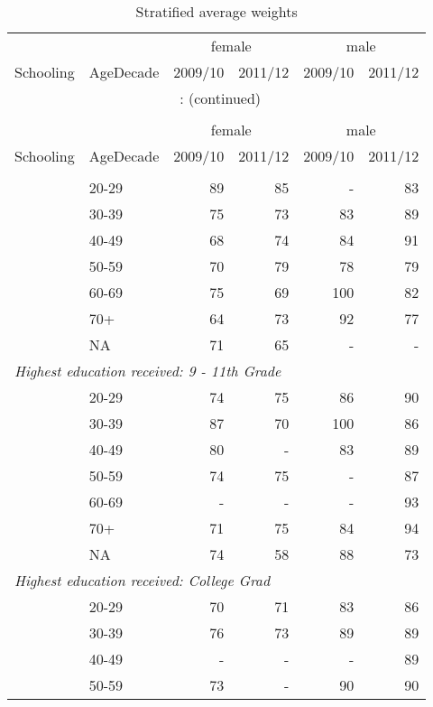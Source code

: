 \documentclass{article}
\begin{document}
\newpage
\hypertarget{Stratified average weights}{} 
\begingroup\footnotesize\begin{longtable}{llrrrr}
\caption{Stratified average weights}\\
\toprule
&&
\multicolumn{2}{c}{female}&\multicolumn{2}{c}{male} \\
\cmidrule(lr){3-4} \cmidrule(lr){5-6}
Schooling & AgeDecade & 2009/10 & 2011/12 & 2009/10 & 2011/12 \\
\hline
\endfirsthead
\multicolumn{6}{c}{\tablename~\thetable{}: (continued)}\\\\
\toprule
&&
\multicolumn{2}{c}{female}&\multicolumn{2}{c}{male} \\
\cmidrule(lr){3-4} \cmidrule(lr){5-6}
Schooling & AgeDecade & 2009/10 & 2011/12 & 2009/10 & 2011/12 \\
\hline
\endhead \hline \endfoot \hline
\endlastfoot
\multicolumn{ 5 }{l}{\textit{ Highest education received: 8th Grade }}\\
&  20-29 & 89 & 85 & - & 83 \\
 &  30-39 & 75 & 73 & 83 & 89 \\
 &  40-49 & 68 & 74 & 84 & 91 \\
 &  50-59 & 70 & 79 & 78 & 79 \\
 &  60-69 & 75 & 69 & 100 & 82 \\
 &  70+ & 64 & 73 & 92 & 77 \\
 & NA & 71 & 65 & - & - \\
\multicolumn{ 5 }{l}{\textit{ Highest education received: 9 - 11th Grade }}\\
&  20-29 & 74 & 75 & 86 & 90 \\
 &  30-39 & 87 & 70 & 100 & 86 \\
 &  40-49 & 80 & - & 83 & 89 \\
 &  50-59 & 74 & 75 & - & 87 \\
 &  60-69 & - & - & - & 93 \\
 &  70+ & 71 & 75 & 84 & 94 \\
 & NA & 74 & 58 & 88 & 73 \\
\multicolumn{ 5 }{l}{\textit{ Highest education received: College Grad }}\\
&  20-29 & 70 & 71 & 83 & 86 \\
 &  30-39 & 76 & 73 & 89 & 89 \\
 &  40-49 & - & - & - & 89 \\
 &  50-59 & 73 & - & 90 & 90 \\

\end{longtable}
\end{document}

